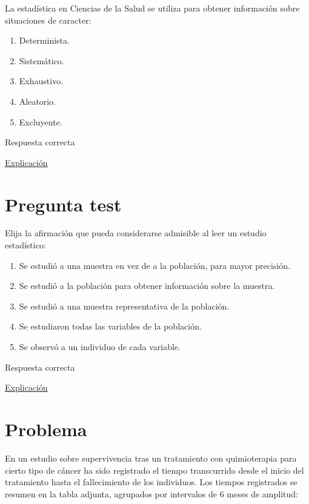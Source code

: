 \documentclass[
]{book}
\providecommand{\tightlist}{%
  \setlength{\itemsep}{0pt}\setlength{\parskip}{0pt}}
\begin{document}
La estadística en Ciencias de la Salud se utiliza para obtener información sobre situaciones de caracter:

\begin{enumerate}
\def\labelenumi{\alph{enumi})}
\tightlist
\item
  Determinista.
\item
  Sistemático.
\item
  Exhaustivo.
\item
  Aleatorio.
\item
  Excluyente.
\end{enumerate}

Respuesta correcta

\href{https://1fjmanzano.github.io/bioestadistica/inferencia-estad\%C3\%ADstica.html}{Explicación}

\hypertarget{pregunta-test-15}{%
\section{Pregunta test}\label{pregunta-test-15}}

Elija la afirmación que pueda considerarse admisible al leer un estudio estadístico:

\begin{enumerate}
\def\labelenumi{\alph{enumi})}
\tightlist
\item
  Se estudió a una muestra en vez de a la población, para mayor precisión.
\item
  Se estudió a la población para obtener información sobre la muestra.
\item
  Se estudió a una muestra representativa de la población.
\item
  Se estudiaron todas las variables de la población.
\item
  Se observó a un individuo de cada variable.
\end{enumerate}

Respuesta correcta

\href{https://1fjmanzano.github.io/bioestadistica/me\%CC\%81todos-de-muestreo.html}{Explicación}

\hypertarget{problema-3}{%
\section{Problema}\label{problema-3}}

En un estudio sobre supervivencia tras un tratamiento con quimioterapia para cierto tipo de cáncer ha sido registrado el tiempo transcurrido desde el inicio del tratamiento hasta el fallecimiento de los individuos. Los tiempos registrados se resumen en la tabla adjunta, agrupados por intervalos de 6 meses de amplitud:
\end{document}
